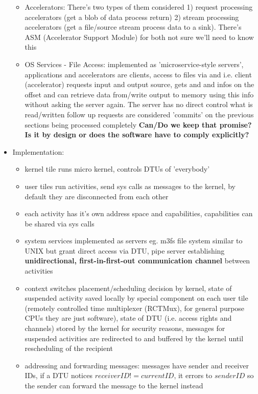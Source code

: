 \begin{itemize}
\begin{itemize}
        \item Accelerators: There's two types of them considered 1) request processing accelerators (get a blob of data \means process \means return) 2) stream processing accelerators (get a file/source \means stream process data to a sink). There's ASM (Accelerator Support Module) for both \means not sure we'll need to know this
        \item OS Services - File Access: implemented as 'microservice-style servers', applications and accelerators are clients, access to files via  and  i.e. client (accelerator) requests input and output source, gets  and  and infos on the offset and can retrieve data from/write output to memory using this info without asking the server again. The server has no direct control what is read/written \means follow up requests are considered 'commits' on the previous sections being processed completely \means \textbf{Can/Do we keep that promise? Is it by design or does the software have to comply explicitly?}
    \end{itemize}
    \item Implementation: 
    \begin{itemize}
        \item kernel tile \means runs micro kernel, controls DTUs of 'everybody'
        \item user tiles \means run activities, send sys calls as messages to the kernel, by default they are disconnected from each other
        \item each activity has it's own address space and capabilities, capabilities can be shared via sys calls
        \item system services implemented as servers \means eg. m3fs file system similar to UNIX but grant direct access via DTU, pipe server establishing \textbf{ unidirectional, first-in-first-out communication channel} between activities
        \item context switches \means  placement/scheduling decision by kernel, state of suspended activity saved locally by special component on each user tile (remotely controlled time multiplexer (RCTMux), for general purpose CPUs they are just software), state of DTU (i.e. access rights and channels) stored by the kernel for security reasons, messages for suspended activities are redirected to and buffered by the kernel until rescheduling of the recipient
        \item addressing and forwarding messages: messages have sender and receiver IDs, if a DTU notices $receiverID != currentID$, it errors to $senderID$ so the sender can forward the message to the kernel instead

\end{itemize}
\end{itemize}
